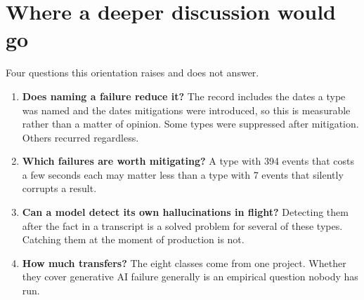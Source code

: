 \documentclass[11pt]{article}
\begin{document}
\section{Where a deeper discussion would go}

Four questions this orientation raises and does not answer.

\begin{enumerate}
  \item \textbf{Does naming a failure reduce it?} The record includes the dates
        a type was named and the dates mitigations were introduced, so this is
        measurable rather than a matter of opinion. Some types were suppressed
        after mitigation. Others recurred regardless.
  \item \textbf{Which failures are worth mitigating?} A type with 394 events that
        costs a few seconds each may matter less than a type with 7 events that
        silently corrupts a result.
  \item \textbf{Can a model detect its own hallucinations in flight?} Detecting
        them after the fact in a transcript is a solved problem for several of
        these types. Catching them at the moment of production is not.
  \item \textbf{How much transfers?} The eight classes come from one project.
        Whether they cover generative AI failure generally is an empirical
        question nobody has run.
\end{enumerate}
\end{document}
